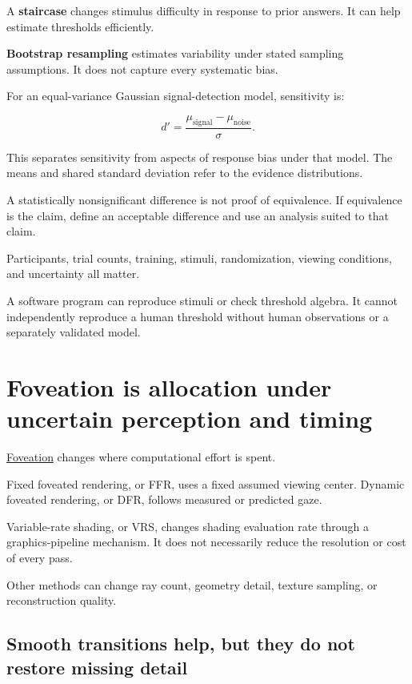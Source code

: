 A \textbf{staircase} changes stimulus difficulty in response to prior answers. It can help estimate thresholds efficiently.

\textbf{Bootstrap resampling} estimates variability under stated sampling assumptions. It does not capture every systematic bias.

For an equal-variance Gaussian signal-detection model, sensitivity is:

\[
d'=\frac{\mu_{\mathrm{signal}}-\mu_{\mathrm{noise}}}{\sigma}.
\]

This separates sensitivity from aspects of response bias under that model. The means and shared standard deviation refer to the evidence distributions.

A statistically nonsignificant difference is not proof of equivalence. If equivalence is the claim, define an acceptable difference and use an analysis suited to that claim.

Participants, trial counts, training, stimuli, randomization, viewing conditions, and uncertainty all matter.

A software program can reproduce stimuli or check threshold algebra. It cannot independently reproduce a human threshold without human observations or a separately validated model.

\section{Foveation is allocation under uncertain perception and timing}\label{04-visual-computing-ii-ch043-foveation-is-allocation-under-uncertain-perception-and-timing}

\hyperref[appendix-5878b813b732]{Foveation} changes where computational effort is spent.

Fixed foveated rendering, or FFR, uses a fixed assumed viewing center. Dynamic foveated rendering, or DFR, follows measured or predicted gaze.

Variable-rate shading, or VRS, changes shading evaluation rate through a graphics-pipeline mechanism. It does not necessarily reduce the resolution or cost of every pass.

Other methods can change ray count, geometry detail, texture sampling, or reconstruction quality.

\subsection{Smooth transitions help, but they do not restore missing detail}\label{04-visual-computing-ii-ch043-smooth-transitions-help-but-they-do-not-restore-missing-detail}

